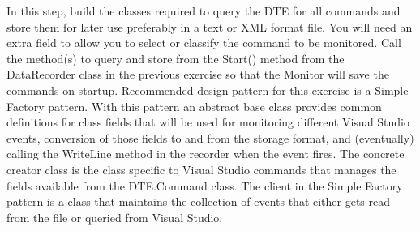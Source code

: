  \begin{Exercise}[ type={program}, difficulty={1}]

In this step, build the classes required to query the DTE for all commands and store them for later use preferably in a text or XML format file.  You will need an extra field to allow you to select or classify the command to be monitored.  Call the method(s) to query and store from the Start() method from the DataRecorder class in the previous exercise so that the Monitor will save the commands on startup.
Recommended design pattern for this exercise is a Simple Factory pattern.  With this pattern an abstract base class provides common definitions for class fields that will be used for monitoring different Visual Studio events, conversion of those fields to and from the storage format, and (eventually) calling the WriteLine method in the recorder when the event fires.  The concrete creator class is the class specific to Visual Studio commands that manages the fields available from the DTE.Command class.  The client in the Simple Factory pattern is a class that maintains the collection of events that either gets read from the file or queried from Visual Studio.
\end{Exercise}

